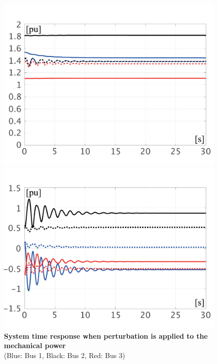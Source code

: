 \documentclass[graybox, envcountchap]{svmult}
\begin{document}
\begin{figure}[t]
{\begin{minipage}{0.49\linewidth}
    \includegraphics[width = 1.0\linewidth]{figs/EabsVP}
    \medskip
  \end{minipage}
  \begin{minipage}{0.49\linewidth}
    \centering
    \includegraphics[width = 1.0\linewidth]{figs/PQP}
    \medskip
  \end{minipage}
  }
  \medskip
  \caption{\textbf{System time response when perturbation is applied to the mechanical power}
  \\  \centering(Blue: Bus 1, Black: Bus 2, Red: Bus 3)}
  \label{fig:KronP}
\medskip
\end{figure}
\end{document}
